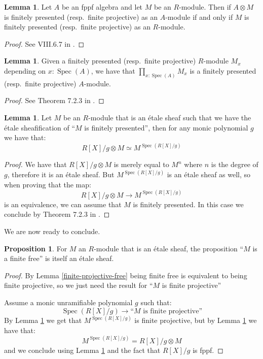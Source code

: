\documentclass[10pt,a4paper]{article}
\theoremstyle{definition}
\newtheorem{lemma}[theorem]{Lemma}
\newtheorem{proposition}[theorem]{Proposition}
\DeclareMathOperator{\Spec}{Spec}
\begin{document}
\begin{lemma}\label{fp-stable-etale-tensor}
  Let $A$ be an fppf algebra and let $M$ be an $R$-module. Then if $A\otimes M$ is finitely presented (resp.\ finite projective)
  as an $A$-module if and only if $M$ is finitely presented (resp.\ finite projective) as an $R$-module.
\end{lemma}

\begin{proof}
See VIII.6.7 in \cite{lombardi-quitte}.
\end{proof}

\begin{lemma}\label{fp-equivalent-pointwise}
  Given a finitely presented (resp.\ finite projective)
  $R$-module $M_x$ depending on $x:\Spec(A)$, we have that $\prod_{x:\Spec(A)}M_x$ is a finitely presented (resp.\ finite projective) $A$-module.
\end{lemma}

\begin{proof}
See Theorem 7.2.3 in \cite{draft}.
\end{proof}

\begin{lemma}\label{descent-sqc-etale}
Let $M$ be an $R$-module that is an \'etale sheaf such that we have the \'etale sheafification of ``$M$ is finitely presented'', then for any monic polynomial $g$ we have that:
\[R[X]/g\otimes M \simeq M^{\Spec(R[X]/g)}\]
\end{lemma}

\begin{proof}
We have that $R[X]/g\otimes M$ is merely equal to $M^n$ where $n$ is the degree of $g$, therefore it is an \'etale sheaf. But $M^{\Spec(R[X]/g)}$ is an \'etale sheaf as well, so when proving that the map:
\[R[X]/g\otimes M \to M^{\Spec(R[X]/g)}\]
is an equivalence, we can assume that $M$ is finitely presented. In this case we conclude by Theorem 7.2.3 in \cite{draft}.
\end{proof}

We are now ready to conclude.

\begin{proposition}\label{descent-finite-free}
For $M$ an $R$-module that is an \'etale sheaf, the proposition ``$M$ is a finite free'' is itself an \'etale sheaf.
\end{proposition}

\begin{proof}
By Lemma \ref{finite-projective-free} being finite free is equivalent to being finite projective, so we just need the result for ``$M$ is finite projective''

Assume a monic unramifiable polynomial $g$ such that:
\[\Spec(R[X]/g) \to \textrm{``$M$ is finite projective''}\]
By Lemma \ref{fp-equivalent-pointwise} we get that $M^{\Spec(R[X]/g)}$ is finite projective, but by Lemma \ref{descent-sqc-etale} we have that:
\[M^{\Spec(R[X]/g)} = R[X]/g\otimes M\] 
and we conclude using Lemma \ref{fp-stable-etale-tensor} and the fact that $R[X]/g$ is fppf.
\end{proof}
\end{document}
